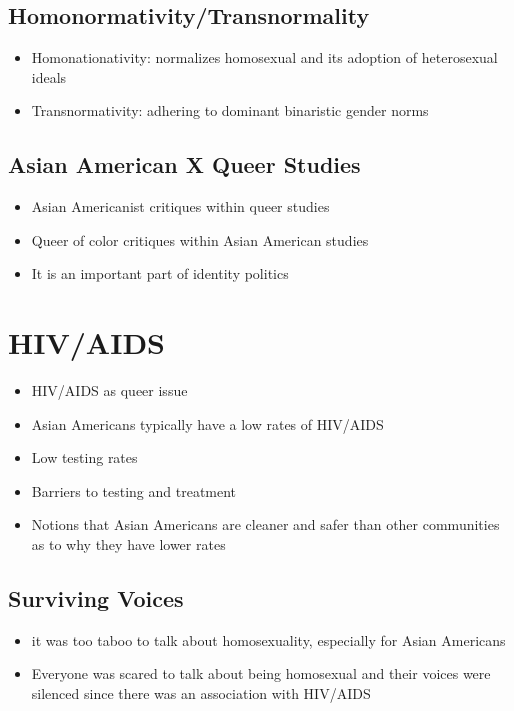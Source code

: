 \documentclass{article}
\begin{document}
\subsection{Homonormativity/Transnormality}
\begin{itemize}
  \item Homonationativity: normalizes homosexual and its adoption of heterosexual ideals
  \item Transnormativity: adhering to dominant binaristic gender norms
\end{itemize}

\subsection{Asian American X Queer Studies}
\begin{itemize}
  \item Asian Americanist critiques within queer studies
  \item Queer of color critiques within Asian American studies
  \item It is an important part of identity politics
\end{itemize}

\section{HIV/AIDS}
\begin{itemize}
  \item HIV/AIDS as queer issue
  \item Asian Americans typically have a low rates
    of HIV/AIDS
  \item Low testing rates
  \item Barriers to testing and treatment
  \item Notions that Asian Americans are cleaner and safer
    than other communities as to why they have lower rates
\end{itemize}

\subsection{Surviving Voices}
\begin{itemize}
  \item it was too taboo to talk about homosexuality, especially for Asian Americans
  \item Everyone was scared to talk about being homosexual and their voices were silenced
    since there was an association with HIV/AIDS
\end{itemize}
\end{document}
